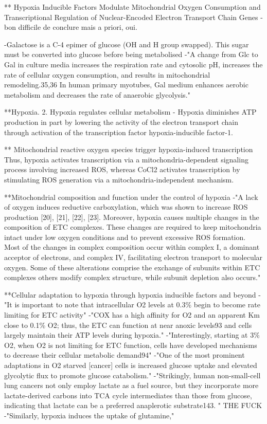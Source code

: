 \documentclass[11pt,a4paper]{article}
\begin{document}
** Hypoxia Inducible Factors Modulate Mitochondrial Oxygen Consumption and Transcriptional Regulation of Nuclear-Encoded Electron Transport Chain Genes
-bon difficile de conclure mais a priori, oui.

-Galactose is a C-4 epimer of glucose (OH and H group swapped). This sugar must be converted into glucose before being metabolised
-"A change from Glc to Gal in culture media increases the respiration rate and cytosolic pH, increases the rate of cellular oxygen consumption, and results in mitochondrial remodeling.35,36 In human primary myotubes, Gal medium enhances aerobic metabolism and decreases the rate of anaerobic glycolysis."


**Hypoxia. 2. Hypoxia regulates cellular metabolism
-  Hypoxia diminishes ATP production in part by lowering the activity of the electron transport chain through activation of the transcription factor hypoxia-inducible factor-1.


** Mitochondrial reactive oxygen species trigger hypoxia-induced transcription
Thus, hypoxia activates transcription via a mitochondria-dependent signaling process involving increased ROS, whereas CoCl2 activates transcription by stimulating ROS generation via a mitochondria-independent mechanism.

**Mitochondrial composition and function under the control of hypoxia
-"A lack of oxygen induces reductive carboxylation, which was shown to increase ROS production [20], [21], [22], [23]. Moreover, hypoxia causes multiple changes in the composition of ETC complexes. These changes are required to keep mitochondria intact under low oxygen conditions and to prevent excessive ROS formation. Most of the changes in complex composition occur within complex I, a dominant acceptor of electrons, and complex IV, facilitating electron transport to molecular oxygen. Some of these alterations comprise the exchange of subunits within ETC complexes others modify complex structure, while subunit depletion also occurs."

**Cellular adaptation to hypoxia through hypoxia inducible factors and beyond
-"It is important to note that intracellular O2 levels at 0.3\% begin to become rate limiting for ETC activity"
-"COX has a high affinity for O2 and an apparent Km close to 0.1\% O2; thus, the ETC can function at near anoxic levels93 and cells largely maintain their ATP levels during hypoxia."
-"Interestingly, starting at 3\% O2, when O2 is not limiting for ETC function, cells have developed mechanisms to decrease their cellular metabolic demand94"
-"One of the most prominent adaptations in O2 starved [cancer] cells is increased glucose uptake and elevated glycolytic flux to promote glucose catabolism."
-"Strikingly, human non-small-cell lung cancers not only employ lactate as a fuel source, but they incorporate more lactate-derived carbons into TCA cycle intermediates than those from glucose, indicating that lactate can be a preferred anaplerotic substrate143. " THE FUCK
-"Similarly, hypoxia induces the uptake of glutamine,"
\end{document}
